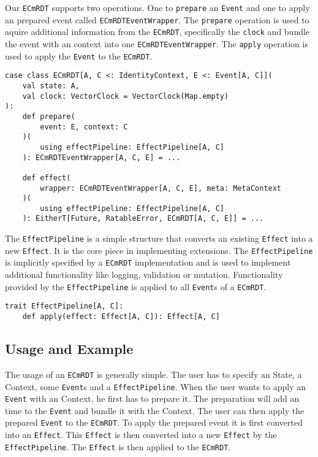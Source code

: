 \documentclass[
	ngerman,
	ruledheaders=section,   %
	class=report,		    %
	thesis={type=bachelor}, %
	accentcolor=9c,			%
	custommargins=false,    %
	marginpar=false,        %
	parskip=half-,          %
	fontsize=11pt,          %
]{tudapub}
\let\code\texttt
\begin{document}
Our \code{ECmRDT} supports two operations. One to \code{prepare} an \code{Event} and one to apply an prepared event called \code{ECmRDTEventWrapper}. The \code{prepare} operation is used to aquire additional information from the \code{ECmRDT}, specifically the \code{clock} and bundle the event with an context into one \code{ECmRDTEventWrapper}. The \code{apply} operation is used to apply the \code{Event} to the \code{ECmRDT}.

\begin{lstlisting}
case class ECmRDT[A, C <: IdentityContext, E <: Event[A, C]](
	val state: A,
	val clock: VectorClock = VectorClock(Map.empty)
):
	def prepare(
		event: E, context: C
	)(
		using effectPipeline: EffectPipeline[A, C]
	): ECmRDTEventWrapper[A, C, E] = ...

	def effect(
		wrapper: ECmRDTEventWrapper[A, C, E], meta: MetaContext
	)(
		using effectPipeline: EffectPipeline[A, C]
	): EitherT[Future, RatableError, ECmRDT[A, C, E]] = ...
\end{lstlisting}

The \code{EffectPipeline} is a simple structure that converts an existing \code{Effect} into a new \code{Effect}. It is the core piece in implementing extensions. The \code{EffectPipeline} is implicitly specified by a \code{ECmRDT} implementation and is used to implement additional functionality like logging, validation or mutation. Functionality provided by the \code{EffectPipeline} is applied to all \code{Event}s of a \code{ECmRDT}.

\begin{lstlisting}
trait EffectPipeline[A, C]:
	def apply(effect: Effect[A, C]): Effect[A, C]
\end{lstlisting}

\subsection{Usage and Example}
The usage of an \code{ECmRDT} is generally simple. The user has to specify an State, a Context, some \code{Event}s and a \code{EffectPipeline}. When the user wants to apply an \code{Event} with an Context, he first has to prepare it. The preparation will add an time to the \code{Event} and bundle it with the Context. The user can then apply the prepared \code{Event} to the \code{ECmRDT}. To apply the prepared event it is first converted into an \code{Effect}. This \code{Effect} is then converted into a new \code{Effect} by the \code{EffectPipeline}. The \code{Effect} is then applied to the \code{ECmRDT}.
\end{document}
